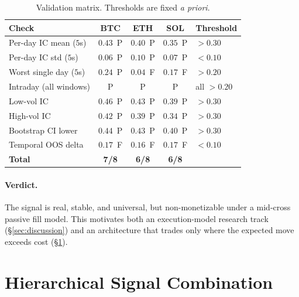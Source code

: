 \documentclass[11pt]{article}
\newcommand{\toprule}{\hline}
\newcommand{\midrule}{\hline}
\newcommand{\bottomrule}{\hline}
\newcommand{\ic}{\textnormal{IC}}
\begin{document}
\begin{table}[h]
\centering\footnotesize
\setlength{\tabcolsep}{5pt}
\caption{Validation matrix. Thresholds are fixed \emph{a priori}.}
\label{tab:matrix}
\begin{tabular}{lcccl}
\toprule
Check & BTC & ETH & SOL & Threshold \\
\midrule
Per-day \ic{} mean ($5$s)   & $0.43$ \,P & $0.40$ \,P & $0.35$ \,P & $> 0.30$ \\
Per-day \ic{} std ($5$s)    & $0.06$ \,P & $0.10$ \,P & $0.07$ \,P & $< 0.10$ \\
Worst single day ($5$s)     & $0.24$ \,P & $0.04$ \,F & $0.17$ \,F & $> 0.20$ \\
Intraday (all windows)      & P & P & P & all $> 0.20$ \\
Low-vol \ic{}               & $0.46$ \,P & $0.43$ \,P & $0.39$ \,P & $> 0.30$ \\
High-vol \ic{}              & $0.42$ \,P & $0.39$ \,P & $0.34$ \,P & $> 0.30$ \\
Bootstrap CI lower          & $0.44$ \,P & $0.43$ \,P & $0.40$ \,P & $> 0.30$ \\
Temporal OOS delta          & $0.17$ \,F & $0.16$ \,F & $0.17$ \,F & $< 0.10$ \\
\midrule
\textbf{Total}              & \textbf{7/8} & \textbf{6/8} & \textbf{6/8} & \\
\bottomrule
\end{tabular}
\end{table}

\paragraph{Verdict.} The signal is real, stable, and universal, but non-monetizable under
a mid-cross passive fill model. This motivates both an execution-model research track
(\S\ref{sec:discussion}) and an architecture that trades only where the expected move
exceeds cost (\S\ref{sec:combiner}).

\section{Hierarchical Signal Combination}\label{sec:combiner}
\end{document}
